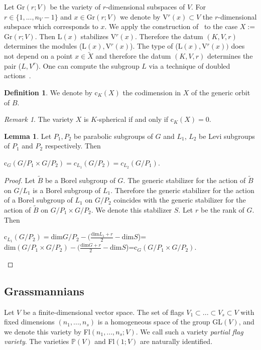 \documentclass[12pt]{amsart}
\theoremstyle{definition}\newtheorem{theorem}{Theorem}[section]
\newtheorem{lemma}[proposition]{Lemma}
\theoremstyle{definition}\newtheorem{definition}[proposition]{Definition}
\theoremstyle{remark}\newtheorem{example}[proposition]{Example}
\newtheorem{remark}[proposition]{Remark}
\begin{document}
Let Gr$(r; V)$ be the variety of $r$-dimensional subspaces of $V$. For $r\in\{1,...,n_V-1\}$ and $x\in$Gr$(r; V)$ we denote by V$^r(x)\subset V$ the $r$-dimensional subspace which corresponds to $x$. We apply the construction of~\cite{Pan} to the case $X:=$Gr$(r; V)$. Then L$(x)$ stabilizes V$^r(x)$. Therefore the datum $(K,V,r)$ determines the modules (L$(x), $V$^r(x)$). The type of (L$(x), $V$^r(x))$ does not depend on a point $x\in\tilde X$ and therefore the datum $(K, V, r)$ determines the pair ($L, V^r$). One can compute the subgroup $L$ via a technique of doubled actions~\cite{Pan}.
\begin{definition}We denote by c$_K(X)$ the codimension in $X$ of the generic orbit of $B$.\end{definition}
\begin{remark}The variety $X$ is $K$-spherical if and only if c$_K(X)=0$.\end{remark}
\begin{lemma}\label{Lgtw}Let $P_1, P_2$ be parabolic subgroups of $G$ and $L_1$, $L_2$ be Levi subgroups of $P_1$ and $P_2$ respectively. Then \begin{center}c$_G(G/P_1\times G/P_2)=c_{L_1}(G/P_2)=c_{L_2}(G/P_1)$.\end{center}\end{lemma}
\begin{proof}Let $\tilde B$ be a Borel subgroup of $G$. The generic stabilizer for the action of $\tilde B$ on $G/L_1$ is a Borel subgroup of $L_1$. Therefore the generic stabilizer for the action of a Borel subgroup of $L_1$ on $G/P_2$ coincides with the generic stabilizer for the action of $\tilde B$ on $G/P_1\times G/P_2$. We denote this stabilizer $S$. Let $r$ be the rank of $G$. Then \begin{center}c$_{L_1}(G/P_2)=$dim$G/P_2-(\frac{\mathrm{dim}L_1+r}{2}-$dim$S$)=\\dim$(G/P_1\times G/P_2)-(\frac{\mathrm{dim}G+r}{2}-$dim$S$)=c$_G(G/P_1\times G/P_2)$.\end{center}\end{proof}
\subsection{Grassmannians}\label{SGr} Let $V$ be a finite-dimensional vector space. The set of flags $V_1\subset...\subset V_s\subset V$ with fixed dimensions $(n_1,..., n_s)$ is a homogeneous space of the group GL$(V)$, and we denote this variety by Fl$(n_1,..., n_s; V)$. We call such a variety {\it partial flag variety}. The varieties $\mathbb P(V)$ and Fl$(1; V)$ are naturally identified.
\end{document}
